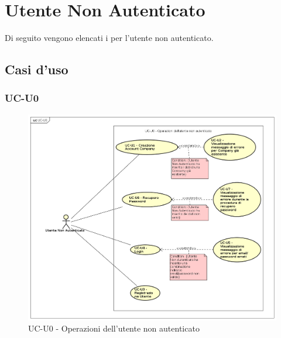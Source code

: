 \section{Utente Non Autenticato}

Di seguito vengono elencati i  per l'utente non autenticato.

\subsection{Casi d'uso}

\subsubsection{UC-U0}
  
    \begin{figure}[H]
      \begin{center}
        \includegraphics[width=12cm]{res/img/UCUtenti/UCUtenteNA/UC-U0.png}
      \caption{UC-U0 - Operazioni dell'utente non autenticato}
      \end{center} 
    \end{figure}    
    
